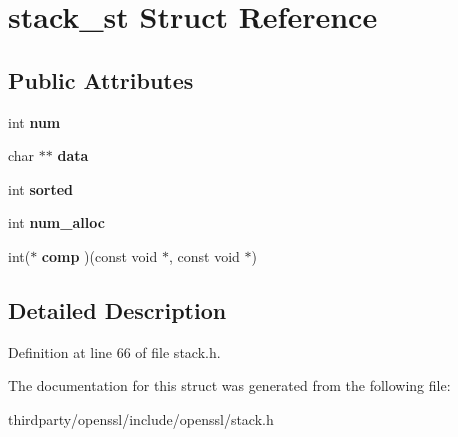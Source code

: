\hypertarget{structstack__st}{}\section{stack\+\_\+st Struct Reference}
\label{structstack__st}
\subsection*{Public Attributes}
\begin{DoxyCompactItemize}
\item 
\mbox{\label{structstack__st_af60cc588694f5798623d33fe70946748}} 
int {\bfseries num}
\item 
\mbox{\label{structstack__st_af7d6fc34731b1971666de50613a0fb53}} 
char $\ast$$\ast$ {\bfseries data}
\item 
\mbox{\label{structstack__st_a8bc2f5dfd119fa8339637dfbca8251d9}} 
int {\bfseries sorted}
\item 
\mbox{\label{structstack__st_a4ad771fe5551133410de60b2e8b2028d}} 
int {\bfseries num\+\_\+alloc}
\item 
\mbox{\label{structstack__st_a91ae59f4cee454d2eef6dc1635e9cf46}} 
int($\ast$ {\bfseries comp} )(const void $\ast$, const void $\ast$)
\end{DoxyCompactItemize}


\subsection{Detailed Description}


Definition at line 66 of file stack.\+h.



The documentation for this struct was generated from the following file\+:\begin{DoxyCompactItemize}
\item 
thirdparty/openssl/include/openssl/stack.\+h\end{DoxyCompactItemize}
